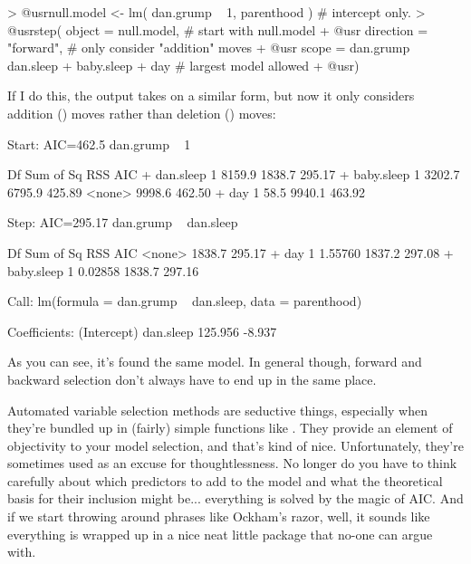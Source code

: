 \begin{rblock1}
> @usr{null.model <- lm( dan.grump ~ 1, parenthood )}   # intercept only.
> @usr{step( object = null.model, }    # start with null.model
+ @usr{      direction = "forward", }  # only consider "addition" moves
+ @usr{      scope =  dan.grump ~ dan.sleep + baby.sleep + day}  # largest model allowed
+ @usr{)}
\end{rblock1}
If I do this, the output takes on a similar form, but now it only considers addition (\rtextoutput{+}) moves rather than deletion (\rtextoutput{-}) moves: 
\begin{rblock1}
Start:  AIC=462.5
dan.grump ~ 1

             Df Sum of Sq    RSS    AIC
+ dan.sleep   1    8159.9 1838.7 295.17
+ baby.sleep  1    3202.7 6795.9 425.89
<none>                    9998.6 462.50
+ day         1      58.5 9940.1 463.92

Step:  AIC=295.17
dan.grump ~ dan.sleep

             Df Sum of Sq    RSS    AIC
<none>                    1838.7 295.17
+ day         1   1.55760 1837.2 297.08
+ baby.sleep  1   0.02858 1838.7 297.16

Call:
lm(formula = dan.grump ~ dan.sleep, data = parenthood)

Coefficients:
(Intercept)    dan.sleep  
    125.956       -8.937  
\end{rblock1}
As you can see, it's found the same model. In general though, forward and backward selection don't always have to end up in the same place.


Automated variable selection methods are seductive things, especially when they're bundled up in (fairly) simple functions like . They provide an element of objectivity to your model selection, and that's kind of nice. Unfortunately, they're sometimes used as an excuse for thoughtlessness. No longer do you have to think carefully about which predictors to add to the model and what the theoretical basis for their inclusion might be... everything is solved by the magic of AIC. And if we start throwing around phrases like Ockham's razor, well, it sounds like everything is wrapped up in a nice neat little package that no-one can argue with.


